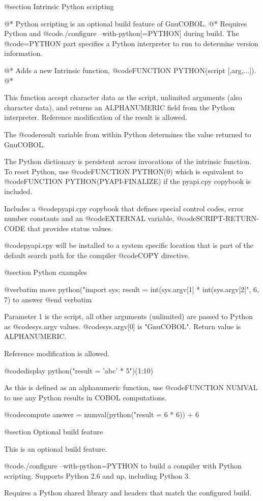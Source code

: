 @section Intrinsic Python scripting

@*
Python scripting is an optional build feature of GnuCOBOL.
@*
Requires Python and @code{./configure --with-python[=PYTHON]} during build.
The @code{=PYTHON} part specifies a Python interpreter to run to determine
version information.

@*
Adds a new Intrinsic function, @code{FUNCTION PYTHON(script [,arg,...])}.
@*

This function accept character data as the script, unlimited arguments
(also character data), and returns an ALPHANUMERIC field from the Python
interpreter.  Reference modification of the result is allowed.

The @code{result} variable from within Python determines the value returned to
GnuCOBOL.

The Python dictionary is persistent across invocations of the intrinsic
function. To reset Python, use @code{FUNCTION PYTHON(0)} which is equivalent
to @code{FUNCTION PYTHON(PYAPI-FINALIZE)} if the pyapi.cpy copybook is
included.

Includes a @code{pyapi.cpy} copybook that defines special control codes, error
number constants and an @code{EXTERNAL} variable, @code{SCRIPT-RETURN-CODE}
that provides status values.

@code{pyapi.cpy} will be installed to a system specific location that is part
of the default search path for the compiler @code{COPY} directive.

@section Python examples

@verbatim
    move python("import sys; result = int(sys.argv[1] * int(sys.argv[2]", 6, 7)
      to answer
@end verbatim

Parameter 1 is the script, all other arguments (unlimited) are passed to Python
as @code{sys.argv} values. @code{sys.argv[0]} is "GnuCOBOL". Return value is
ALPHANUMERIC.

Reference modification is allowed.

    @code{display python("result = 'abc' * 5")(1:10)}

As this is defined as an alphanumeric function, use @code{FUNCTION NUMVAL} to
use any Python results in COBOL computations.

    @code{compute answer = numval(python("result = 6 * 6)) + 6}

@section Optional build feature

This is an optional build feature.

@code{./configure --with-python=PYTHON} to build a compiler with Python
scripting.  Supports Python 2.6 and up, including Python 3.

Requires a Python shared library and headers that match the configured build.
